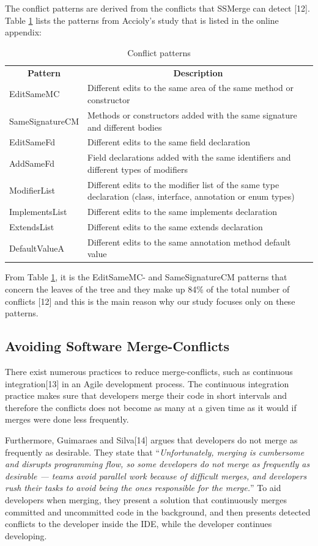 The conflict patterns are derived from the conflicts that SSMerge can detect [12]. Table \ref{table:conflictpatterns} lists the patterns from Accioly’s study that is listed in the online appendix:\\%
\begin{table}
\caption{Conflict patterns}\label{table:conflictpatterns}
\begin{tabular}{| l | p{10cm} |}
\hline
\multicolumn{1}{c}{\textbf{Pattern}} & \multicolumn{1}{c}{\textbf{Description}}\\
EditSameMC & Different edits to the same area of the same method or constructor\\
SameSignatureCM & Methods or constructors added with the same signature and different bodies\\
EditSameFd & Different edits to the same field declaration\\
AddSameFd & Field declarations added with the same identifiers and different types of modifiers\\
ModifierList & Different edits to the modifier list of the same type declaration (class, interface, annotation or enum types)\\
ImplementsList & Different edits to the same implements declaration\\
ExtendsList & Different edits to the same extends declaration\\
DefaultValueA & Different edits to the same annotation method default value
\end{tabular}
\end{table}
From Table \ref{table:conflictpatterns}, it is the EditSameMC- and SameSignatureCM patterns that concern the leaves of the tree and they make up 84\% of the total number of conflicts [12] and this is the main reason why our study focuses only on these patterns.

\subsection{Avoiding Software Merge-Conflicts}
There exist numerous practices to reduce merge-conflicts, such as continuous integration[13] in an Agile development process. The continuous integration practice makes sure that developers merge their code in short intervals and therefore the conflicts does not become as many at a given time as it would if merges were done less frequently.

Furthermore, Guimaraes and Silva[14] argues that developers do not merge as frequently as desirable. They state that “\textit{Unfortunately, merging is cumbersome and disrupts programming flow, so some developers do not merge as frequently as desirable — teams avoid parallel work because of difficult merges, and developers rush their tasks to avoid being the ones responsible for the merge.}” To aid developers when merging, they present a solution that continuously merges committed and uncommitted code in the background, and then presents detected conflicts to the developer inside the IDE, while the developer continues developing.


